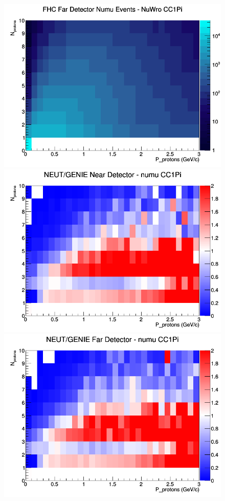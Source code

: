 \begin{figure}[h]
\endminipage
{}
\includegraphics[width=\linewidth]{N_P/nominal/protons/CC1Pi_FHC_FD_numu_N_P_NuWro.png}
\endminipage
\newline
{}
\includegraphics[width=\linewidth]{N_P/nominal/protons/ratios/CC1Pi_NEUT_GENIE_numu_near_N_P.png}
\endminipage
{}
\includegraphics[width=\linewidth]{N_P/nominal/protons/ratios/CC1Pi_NEUT_GENIE_numu_far_N_P.png}

\end{figure}
